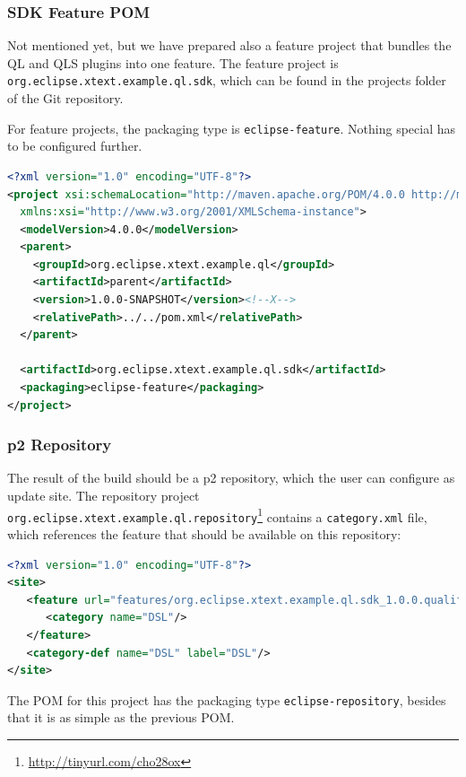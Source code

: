 \subsubsection{SDK Feature POM}
Not mentioned yet, but we have prepared also a feature project that bundles the
QL and QLS plugins into one feature. The feature project is
\texttt{org.eclipse.xtext.example.ql.sdk}, which can be found in the projects folder of
the Git repository.

For feature projects, the packaging type is \texttt{eclipse-feature}. Nothing special has
to be configured further.

\begin{lstlisting}[language=XML]
<?xml version="1.0" encoding="UTF-8"?>
<project xsi:schemaLocation="http://maven.apache.org/POM/4.0.0 http://maven.apache.org/xsd/maven-4.0.0.xsd" xmlns="http://maven.apache.org/POM/4.0.0"
  xmlns:xsi="http://www.w3.org/2001/XMLSchema-instance">
  <modelVersion>4.0.0</modelVersion>
  <parent>
    <groupId>org.eclipse.xtext.example.ql</groupId>
    <artifactId>parent</artifactId>
    <version>1.0.0-SNAPSHOT</version><!--X-->
    <relativePath>../../pom.xml</relativePath>
  </parent>

  <artifactId>org.eclipse.xtext.example.ql.sdk</artifactId>
  <packaging>eclipse-feature</packaging>
</project>
\end{lstlisting}

\subsubsection{p2 Repository}
The result of the build should be a p2 repository, which the user can configure
as update site. The repository project
\texttt{org.eclipse.xtext.example.ql.repository}\footnote{\url{http://tinyurl.com/cho28ox}}
contains a \texttt{category.xml} file, which references the feature that should be available on this repository:

\begin{lstlisting}[language=XML]
<?xml version="1.0" encoding="UTF-8"?>
<site>
   <feature url="features/org.eclipse.xtext.example.ql.sdk_1.0.0.qualifier.jar" id="org.eclipse.xtext.example.ql.sdk" version="1.0.0.qualifier">
      <category name="DSL"/>
   </feature>
   <category-def name="DSL" label="DSL"/>
</site>
\end{lstlisting}

The POM for this project has the packaging type \texttt{eclipse-repository},
besides that it is as simple as the previous POM.

